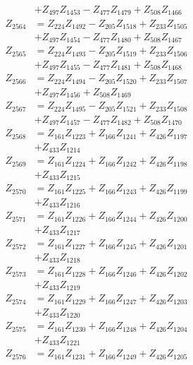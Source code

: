 \begin{multicols}{2}
\begin{align}
&+ Z_{497}Z_{1453} - Z_{477}Z_{1479} + Z_{508}Z_{1466} \nonumber \\
Z_{2564} &= Z_{224}Z_{1492} - Z_{205}Z_{1518} + Z_{233}Z_{1505}  \nonumber \\
&+ Z_{497}Z_{1454} - Z_{477}Z_{1480} + Z_{508}Z_{1467} \nonumber \\
Z_{2565} &= Z_{224}Z_{1493} - Z_{205}Z_{1519} + Z_{233}Z_{1506}  \nonumber \\
&+ Z_{497}Z_{1455} - Z_{477}Z_{1481} + Z_{508}Z_{1468} \nonumber \\
Z_{2566} &= Z_{224}Z_{1494} - Z_{205}Z_{1520} + Z_{233}Z_{1507}  \nonumber \\
&+ Z_{497}Z_{1456} + Z_{508}Z_{1469} \nonumber \\
Z_{2567} &= Z_{224}Z_{1495} - Z_{205}Z_{1521} + Z_{233}Z_{1508}  \nonumber \\
&+ Z_{497}Z_{1457} - Z_{477}Z_{1482} + Z_{508}Z_{1470} \nonumber \\
Z_{2568} &= Z_{161}Z_{1223} + Z_{166}Z_{1241} + Z_{426}Z_{1197}  \nonumber \\
&+ Z_{433}Z_{1214} \nonumber \\
Z_{2569} &= Z_{161}Z_{1224} + Z_{166}Z_{1242} + Z_{426}Z_{1198}  \nonumber \\
&+ Z_{433}Z_{1215} \nonumber \\
Z_{2570} &= Z_{161}Z_{1225} + Z_{166}Z_{1243} + Z_{426}Z_{1199}  \nonumber \\
&+ Z_{433}Z_{1216} \nonumber \\
Z_{2571} &= Z_{161}Z_{1226} + Z_{166}Z_{1244} + Z_{426}Z_{1200}  \nonumber \\
&+ Z_{433}Z_{1217} \nonumber \\
Z_{2572} &= Z_{161}Z_{1227} + Z_{166}Z_{1245} + Z_{426}Z_{1201}  \nonumber \\
&+ Z_{433}Z_{1218} \nonumber \\
Z_{2573} &= Z_{161}Z_{1228} + Z_{166}Z_{1246} + Z_{426}Z_{1202}  \nonumber \\
&+ Z_{433}Z_{1219} \nonumber \\
Z_{2574} &= Z_{161}Z_{1229} + Z_{166}Z_{1247} + Z_{426}Z_{1203}  \nonumber \\
&+ Z_{433}Z_{1220} \nonumber \\
Z_{2575} &= Z_{161}Z_{1230} + Z_{166}Z_{1248} + Z_{426}Z_{1204}  \nonumber \\
&+ Z_{433}Z_{1221} \nonumber \\
Z_{2576} &= Z_{161}Z_{1231} + Z_{166}Z_{1249} + Z_{426}Z_{1205}  \nonumber \\

\end{align}
\end{multicols}
